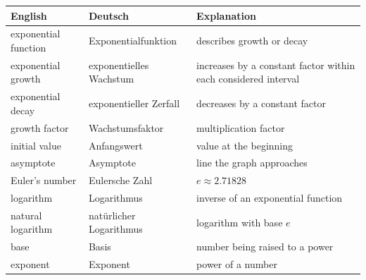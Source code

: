 \begin{tabular}{p{}p{}p{}}
\textbf{English} & \textbf{Deutsch} & \textbf{Explanation} \\ \hline
exponential function & Exponentialfunktion & describes growth or decay \\
exponential growth & exponentielles Wachstum & increases by a constant factor within each considered interval \\
exponential decay & exponentieller Zerfall & decreases by a constant factor \\
growth factor & Wachstumsfaktor & multiplication factor \\
initial value & Anfangswert & value at the beginning \\
asymptote & Asymptote & line the graph approaches \\
Euler's number & Eulersche Zahl & $e\approx2.71828$ \\
logarithm & Logarithmus & inverse of an exponential function \\
natural logarithm & natürlicher Logarithmus & logarithm with base $e$ \\
base & Basis & number being raised to a power \\
exponent & Exponent & power of a number \\
\end{tabular}